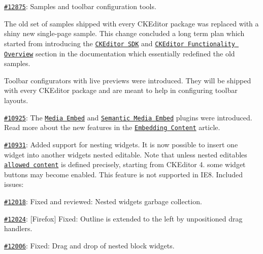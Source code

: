 \begin{DoxyItemize}
\begin{DoxyItemize}
\begin{DoxyItemize}
\end{DoxyItemize}
\end{DoxyItemize}
\item \href{http://dev.ckeditor.com/ticket/12875}{\tt \#12875}\+: Samples and toolbar configuration tools.
\begin{DoxyItemize}
\item The old set of samples shipped with every C\+K\+Editor package was replaced with a shiny new single-\/page sample. This change concluded a long term plan which started from introducing the \href{http://sdk.ckeditor.com/}{\tt C\+K\+Editor S\+DK} and \href{http://docs.ckeditor.com/#!/guide/dev_features}{\tt C\+K\+Editor Functionality Overview} section in the documentation which essentially redefined the old samples.
\item Toolbar configurators with live previews were introduced. They will be shipped with every C\+K\+Editor package and are meant to help in configuring toolbar layouts.
\end{DoxyItemize}
\item \href{http://dev.ckeditor.com/ticket/10925}{\tt \#10925}\+: The \href{http://ckeditor.com/addon/embed}{\tt Media Embed} and \href{http://ckeditor.com/addon/embedsemantic}{\tt Semantic Media Embed} plugins were introduced. Read more about the new features in the \href{http://docs.ckeditor.com/#!/guide/dev_media_embed}{\tt Embedding Content} article.
\item \href{http://dev.ckeditor.com/ticket/10931}{\tt \#10931}\+: Added support for nesting widgets. It is now possible to insert one widget into another widget\textquotesingle{}s nested editable. Note that unless nested editable\textquotesingle{}s \href{http://docs.ckeditor.com/#!/api/CKEDITOR.plugins.widget.nestedEditable.definition-property-allowedContent}{\tt allowed content} is defined precisely, starting from C\+K\+Editor 4. some widget buttons may become enabled. This feature is not supported in I\+E8. Included issues\+:
\begin{DoxyItemize}
\item \href{http://dev.ckeditor.com/ticket/12018}{\tt \#12018}\+: Fixed and reviewed\+: Nested widgets garbage collection.
\item \href{http://dev.ckeditor.com/ticket/12024}{\tt \#12024}\+: \mbox{[}Firefox\mbox{]} Fixed\+: Outline is extended to the left by unpositioned drag handlers.
\item \href{http://dev.ckeditor.com/ticket/12006}{\tt \#12006}\+: Fixed\+: Drag and drop of nested block widgets.

\end{DoxyItemize}
\end{DoxyItemize}
